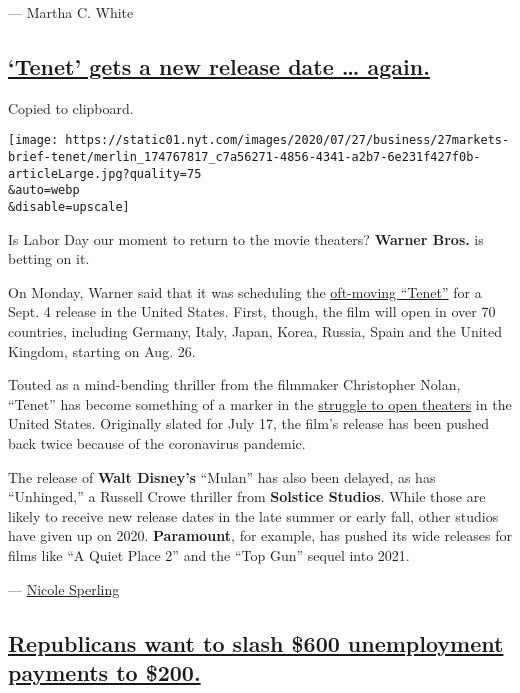 --- Martha C. White

\hypertarget{tenet-gets-a-new-release-date--again}{%
\subsection{\texorpdfstring{\protect\hyperlink{tenet-gets-a-new-release-date-again}{`Tenet'
gets a new release date \ldots{}
again.}}{`Tenet' gets a new release date \ldots{} again.}}\label{tenet-gets-a-new-release-date--again}}

Copied to clipboard.

\texttt{[image: https://static01.nyt.com/images/2020/07/27/business/27markets-brief-tenet/merlin\_174767817\_c7a56271-4856-4341-a2b7-6e231f427f0b-articleLarge.jpg?quality=75\\\&auto=webp\\\&disable=upscale]}

Is Labor Day our moment to return to the movie theaters? \textbf{Warner
Bros.} is betting on it.

On Monday, Warner said that it was scheduling the
\href{https://www.nytimes.com/2020/06/12/business/media/tenet-release-delayed.html}{oft-moving
``Tenet''} for a Sept. 4 release in the United States. First, though,
the film will open in over 70 countries, including Germany, Italy,
Japan, Korea, Russia, Spain and the United Kingdom, starting on Aug. 26.

Touted as a mind-bending thriller from the filmmaker Christopher Nolan,
``Tenet'' has become something of a marker in the
\href{https://www.nytimes.com/2020/06/12/business/media/tenet-release-delayed.html?searchResultPosition=3}{struggle
to open theaters} in the United States. Originally slated for July 17,
the film's release has been pushed back twice because of the coronavirus
pandemic.

The release of \textbf{Walt Disney's} ``Mulan'' has also been delayed,
as has ``Unhinged,'' a Russell Crowe thriller from \textbf{Solstice
Studios}. While those are likely to receive new release dates in the
late summer or early fall, other studios have given up on 2020.
\textbf{Paramount}, for example, has pushed its wide releases for films
like ``A Quiet Place 2'' and the ``Top Gun'' sequel into 2021.

--- \href{https://www.nytimes.com/by/nicole-sperling}{Nicole Sperling}

\hypertarget{republicans-want-to-slash-600-unemployment-payments-to-200}{%
\subsection{\texorpdfstring{\protect\hyperlink{republicans-want-to-slash-600-unemployment-payments-to-200}{Republicans
want to slash \$600 unemployment payments to
\$200.}}{Republicans want to slash \$600 unemployment payments to \$200.}}\label{republicans-want-to-slash-600-unemployment-payments-to-200}}

